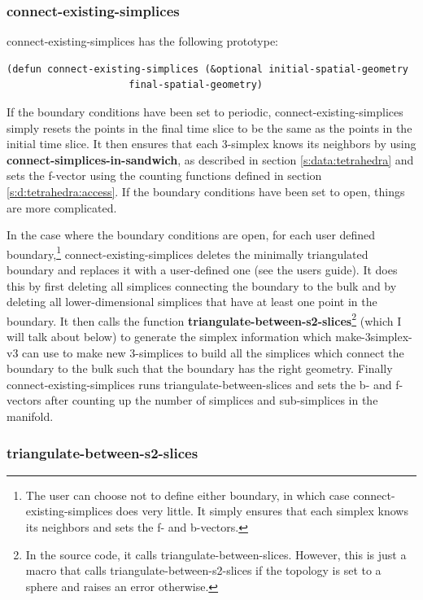 \documentclass[12pt]{article}
\begin{document}
\subsubsection{connect-existing-simplices}

connect-existing-simplices has the following prototype:
\begin{small}
\begin{lstlisting}
(defun connect-existing-simplices (&optional initial-spatial-geometry 
				     final-spatial-geometry)
\end{lstlisting}
\end{small}
If the boundary conditions have been set to periodic,
connect-existing-simplices simply resets the points in the final time
slice to be the same as the points in the initial time slice. It then
ensures that each 3-simplex knows its neighbors by using
\textbf{connect-simplices-in-sandwich}, as described in section
\ref{s:data:tetrahedra} and sets the f-vector using the counting
functions defined in section \ref{s:d:tetrahedra:access}. If the
boundary conditions have been set to open, things are more
complicated.

In the case where the boundary conditions are open, for each user
defined boundary,\footnote{The user can choose not to define either
  boundary, in which case connect-existing-simplices does very
  little. It simply ensures that each simplex knows its neighbors and
  sets the f- and b-vectors.}  connect-existing-simplices deletes the
minimally triangulated boundary and replaces it with a user-defined
one (see the users guide). It does this by first deleting all
simplices connecting the boundary to the bulk and by deleting all
lower-dimensional simplices that have at least one point in the
boundary. It then calls the function
\textbf{triangulate-between-s2-slices}\footnote{In the source code, it
  calls triangulate-between-slices. However, this is just a macro that
  calls triangulate-between-s2-slices if the topology is set to a
  sphere and raises an error otherwise.} (which I will talk about
below) to generate the simplex information which make-3simplex-v3 can
use to make new 3-simplices to build all the simplices which connect
the boundary to the bulk such that the boundary has the right
geometry. Finally connect-existing-simplices runs
triangulate-between-slices and sets the b- and f-vectors after
counting up the number of simplices and sub-simplices in the manifold.

\subsubsection{triangulate-between-s2-slices}
\label{sss:triangulate-between-slices}
\end{document}
